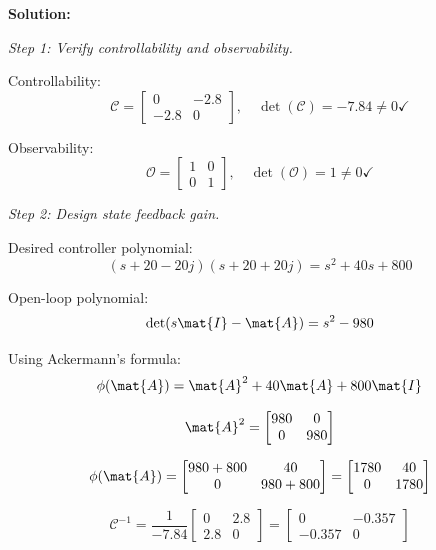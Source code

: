 \textbf{Solution:}

\textit{Step 1: Verify controllability and observability.}

Controllability:
\begin{equation}
\mathcal{C} = \begin{bmatrix} 0 & -2.8 \\ -2.8 & 0 \end{bmatrix}, \quad
\det(\mathcal{C}) = -7.84 \neq 0 \checkmark
\end{equation}

Observability:
\begin{equation}
\mathcal{O} = \begin{bmatrix} 1 & 0 \\ 0 & 1 \end{bmatrix}, \quad
\det(\mathcal{O}) = 1 \neq 0 \checkmark
\end{equation}

\textit{Step 2: Design state feedback gain.}

Desired controller polynomial:
\begin{equation}
(s+20-20j)(s+20+20j) = s^2 + 40s + 800
\end{equation}

Open-loop polynomial:
\begin{equation}
\det(s\mat{I} - \mat{A}) = s^2 - 980
\end{equation}

Using Ackermann's formula:
\begin{equation}
\phi(\mat{A}) = \mat{A}^2 + 40\mat{A} + 800\mat{I}
\end{equation}

\begin{equation}
\mat{A}^2 = \begin{bmatrix} 980 & 0 \\ 0 & 980 \end{bmatrix}
\end{equation}

\begin{equation}
\phi(\mat{A}) = \begin{bmatrix} 980+800 & 40 \\ 0 & 980+800 \end{bmatrix}
= \begin{bmatrix} 1780 & 40 \\ 0 & 1780 \end{bmatrix}
\end{equation}

\begin{equation}
\mathcal{C}^{-1} = \frac{1}{-7.84}\begin{bmatrix} 0 & 2.8 \\ 2.8 & 0 \end{bmatrix}
= \begin{bmatrix} 0 & -0.357 \\ -0.357 & 0 \end{bmatrix}
\end{equation}

